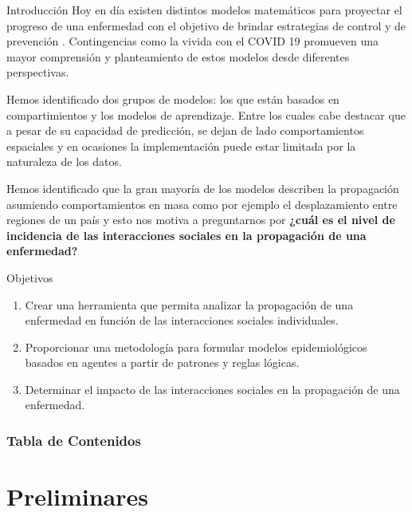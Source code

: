 \documentclass[9pt]{beamer}
\subtitle{\\
\LARGE{CAsimulations: Modelación de dinámicas topológicas } \\
\LARGE{en la propagación de una enfermedad usando}\\
\LARGE{autómatas celulares}}
\author{Jorge Andres Ibañez Huertas, 
Carlos Isaac Zainea Maya}
\institute{Central University, Bogotá}
\date{\today}
\begin{document}
\titlepage

\begin{frame}{Introducción}
Hoy en día existen distintos modelos matemáticos para proyectar el progreso de una enfermedad con el objetivo de brindar estrategias de control y de prevención \cite{epiDictionary}. Contingencias como la vivida con el COVID 19 promueven una mayor comprensión y planteamiento de estos modelos desde diferentes perspectivas.

Hemos identificado dos grupos de modelos: los que están basados en compartimientos y los modelos de aprendizaje. Entre los cuales cabe destacar que a pesar de su capacidad de predicción, se dejan de lado comportamientos espaciales y en ocasiones la implementación puede estar limitada por la naturaleza de los datos.

Hemos identificado que la gran mayoría de los modelos describen la propagación asumiendo comportamientos en masa como por ejemplo el desplazamiento entre regiones de un país \cite{populationDensity} y esto nos motiva a preguntarnos por \textbf{¿cuál es el nivel de incidencia de las interacciones sociales en la propagación de una enfermedad?}

\end{frame}

\begin{frame}{Objetivos}
\begin{enumerate}
    \item Crear una herramienta que permita analizar la propagación de una enfermedad en función de las interacciones sociales individuales.
    \item Proporcionar una metodología para formular modelos epidemiológicos basados en agentes a partir de patrones y reglas lógicas.
    \item Determinar el impacto de las interacciones sociales en la propagación de una enfermedad.
\end{enumerate}
\end{frame}

\begin{frame}
\frametitle{Tabla de Contenidos}
\tableofcontents
\end{frame}

\section{Preliminares}
\end{document}
